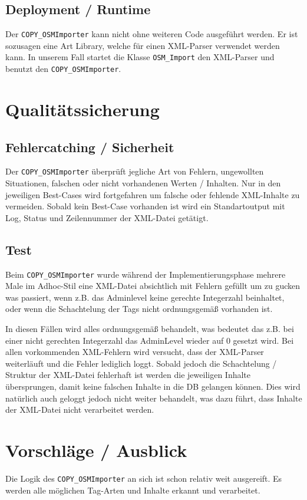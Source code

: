 \subsection{Deployment / Runtime}
Der {\tt COPY\_OSMImporter} kann nicht ohne weiteren Code ausgeführt werden. Er ist sozusagen eine Art Library, welche für einen XML-Parser verwendet werden kann. In unserem Fall startet die Klasse {\tt OSM\_Import} den XML-Parser und benutzt den {\tt COPY\_OSMImporter}.

\section{Qualitätssicherung}

\subsection{Fehlercatching / Sicherheit}
Der {\tt COPY\_OSMImporter} überprüft jegliche Art von Fehlern, ungewollten Situationen, falschen oder nicht vorhandenen Werten / Inhalten. Nur in den jeweiligen Best-Cases wird fortgefahren um falsche oder fehlende XML-Inhalte zu vermeiden. Sobald kein Best-Case vorhanden ist wird ein Standartoutput mit Log, Status und Zeilennummer der XML-Datei getätigt.

\subsection{Test}
Beim {\tt COPY\_OSMImporter} wurde während der Implementierungsphase mehrere Male im Adhoc-Stil eine XML-Datei absichtlich mit Fehlern gefüllt um zu gucken was passiert, wenn z.B. das Adminlevel keine gerechte Integerzahl beinhaltet, oder wenn die Schachtelung der Tags nicht ordnungsgemäß vorhanden ist.

In diesen Fällen wird alles ordnungsgemäß behandelt, was bedeutet das z.B. bei einer nicht gerechten Integerzahl das AdminLevel wieder auf 0 gesetzt wird. Bei allen vorkommenden XML-Fehlern wird versucht, dass der XML-Parser weiterläuft und die Fehler lediglich loggt. Sobald jedoch die Schachtelung / Struktur der XML-Datei fehlerhaft ist werden die jeweiligen Inhalte übersprungen, damit keine falschen Inhalte in die DB gelangen können. Dies wird natürlich auch geloggt jedoch nicht weiter behandelt, was dazu führt, dass Inhalte der XML-Datei nicht verarbeitet werden.

\section{Vorschläge / Ausblick}
Die Logik des {\tt COPY\_OSMImporter} an sich ist schon relativ weit ausgereift. Es werden alle möglichen Tag-Arten und Inhalte erkannt und verarbeitet.

